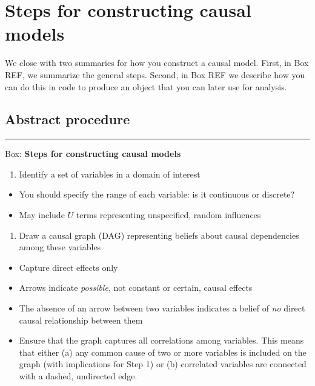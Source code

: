 \documentclass[12pt,]{book}
\providecommand{\tightlist}{%
  \setlength{\itemsep}{0pt}\setlength{\parskip}{0pt}}
\begin{document}
\hypertarget{steps-for-constructing-causal-models}{%
\section{Steps for constructing causal models}\label{steps-for-constructing-causal-models}}

We close with two summaries for how you construct a causal model. First, in Box REF, we summarize the general steps. Second, in Box REF we describe how you can do this in code to produce an object that you can later use for analysis.

\hypertarget{abstract-procedure}{%
\subsection{Abstract procedure}\label{abstract-procedure}}

\begin{center}\rule{0.5\linewidth}{\linethickness}\end{center}

Box: \textbf{Steps for constructing causal models}

\begin{enumerate}
\def\labelenumi{\arabic{enumi}.}
\tightlist
\item
  Identify a set of variables in a domain of interest
\end{enumerate}

\begin{itemize}
\tightlist
\item
  You should specify the range of each variable: is it continuous or discrete?
\item
  May include \(U\) terms representing unspecified, random influences
\end{itemize}

\begin{enumerate}
\def\labelenumi{\arabic{enumi}.}
\setcounter{enumi}{1}
\tightlist
\item
  Draw a causal graph (DAG) representing beliefs about causal dependencies among these variables
\end{enumerate}

\begin{itemize}
\tightlist
\item
  Capture direct effects only
\item
  Arrows indicate \emph{possible}, not constant or certain, causal effects
\item
  The absence of an arrow between two variables indicates a belief of \emph{no} direct causal relationship between them
\item
  Ensure that the graph captures all correlations among variables. This means that either (a) any common cause of two or more variables is included on the graph (with implications for Step 1) or (b) correlated variables are connected with a dashed, undirected edge.
\end{itemize}
\end{document}
